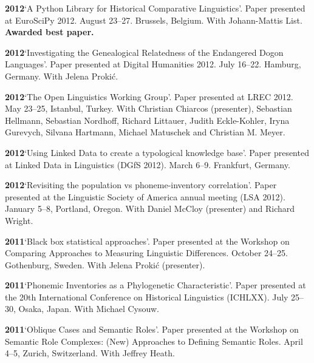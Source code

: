 \documentclass[11pt]{article}
\newcommand{\hangpara}{
 \setlength{\parindent}{0in} %
 \hangindent=0.42in %
}
\begin{document}
\vskip 6pt
\hangpara
{\bf 2012}\hspace{1ex}`A Python Library for Historical Comparative Linguistics'. Paper presented at EuroSciPy 2012. August 23--27. Brussels, Belgium. With Johann-Mattis List. \textbf{Awarded best paper.}

\vskip 6pt
\hangpara
{\bf 2012}\hspace{1ex}`Investigating the Genealogical Relatedness of the Endangered Dogon Languages'. Paper presented at Digital Humanities 2012. July 16--22. Hamburg, Germany. With Jelena Proki{\'c}.

\vskip 6pt
\hangpara
{\bf 2012}\hspace{1ex}`The Open Linguistics Working Group'. Paper presented at LREC 2012. May 23--25, Istanbul, Turkey. With Christian Chiarcos (presenter), Sebastian Hellmann, Sebastian Nordhoff, Richard Littauer, Judith Eckle-Kohler, Iryna Gurevych, Silvana Hartmann, Michael Matuschek and Christian M. Meyer.

\vskip 6pt
\hangpara
{\bf 2012}\hspace{1ex}`Using Linked Data to create a typological knowledge base'. Paper presented at Linked Data in Linguistics (DGfS 2012). March 6--9. Frankfurt, Germany.

\vskip 6pt
\hangpara
{\bf 2012}\hspace{1ex}`Revisiting the population vs phoneme-inventory correlation'. Paper presented at the Linguistic Society of America annual meeting (LSA 2012). January 5--8, Portland, Oregon. With Daniel McCloy (presenter) and Richard Wright.

\vskip 6pt
\hangpara
{\bf 2011}\hspace{1ex}`Black box statistical approaches'. Paper presented at the Workshop on Comparing Approaches to Measuring Linguistic Differences. October 24--25. Gothenburg, Sweden. With Jelena Proki{\'c} (presenter).

\vskip 6pt
\hangpara
{\bf 2011}\hspace{1ex}`Phonemic Inventories as a Phylogenetic Characteristic'. Paper presented at the 20th International Conference on Historical Linguistics (ICHLXX). July 25--30, Osaka, Japan. With Michael Cysouw.

\vskip 6pt
\hangpara
{\bf 2011}\hspace{1ex}`Oblique Cases and Semantic Roles'. Paper presented at the Workshop on Semantic Role Complexes: (New) Approaches to Defining Semantic Roles. April 4--5, Zurich, Switzerland. With Jeffrey Heath.
\end{document}
